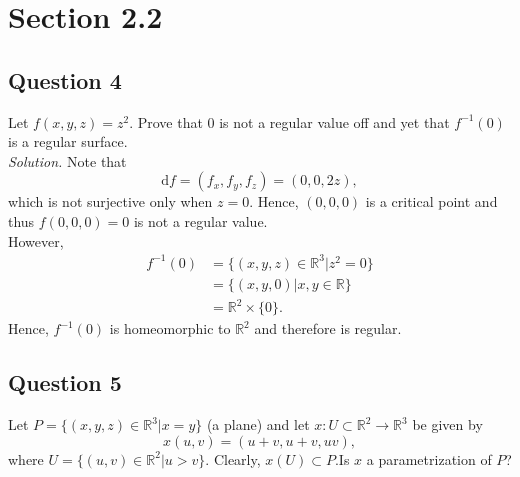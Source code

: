 \documentclass[12pt]{article}
\begin{document}
\section{Section 2.2}

\subsection*{Question 4}
Let $f(x, y, z) = z^2$. Prove that $0$ is not a regular value off and yet that $f^{-1}(0)$ is a regular surface.\\

\textit{Solution.} Note that \begin{equation*}
    \mathrm df = (f_x,f_y,f_z) = (0,0,2z),
\end{equation*}
which is not surjective only when $z=0$. Hence, $(0,0,0)$ is a critical point and thus $f(0,0,0)=0$ is not a regular value.\\

However, \begin{align*}
    f^{-1}(0) &= \{(x,y,z)\in \mathbb{R}^3|z^2 = 0\}\\
    &= \{(x,y,0)|x,y \in \mathbb{R}\} \\
    &= \mathbb{R}^2 \times \{0\}.
\end{align*}
Hence, $f^{-1}(0)$ is homeomorphic to $\mathbb{R}^2$ and therefore is regular.

\subsection*{Question 5}
Let $P= \{(x,y,z)\in \mathbb{R}^3|x= y\}$ (a plane) and let $x:U \subset \mathbb{R}^2 \to \mathbb{R}^3$ be given by \begin{equation*}
    x(u,v) = (u+v,u+v,uv),
\end{equation*}
 where $U=\{(u,v)\in \mathbb{R}^2|u>v\}$. Clearly, $x(U)\subset P$.Is $x$ a parametrization of $P$?\\
\end{document}
